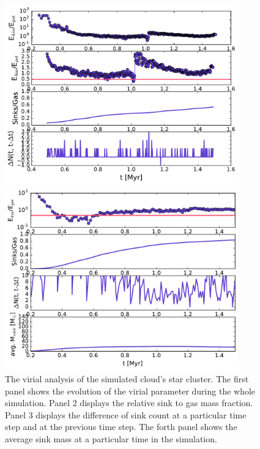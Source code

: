 \begin{figure}[!htb]
 \centering
 \includegraphics[width=0.9\textwidth]{Figures/cloud_plots/virial_IRcloud}
 \captionsetup{justification=justified,singlelinecheck=false,width=\linewidth}
 \decoRule
 \caption[The star cluster's virial analysis]{The virial analysis of the simulated cloud's star cluster.
                                              The first panel shows the evolution of the virial parameter during the whole simulation.
                                              Panel 2 displays the relative sink to gas mass fraction.
                                              Panel 3 displays the difference of sink count at a particular time step and at the previous time step.
                                              The forth panel shows the average sink mass at a particular time in the simulation.}
 \label{fig:Cluster_virial}
 \includegraphics[width=0.9\textwidth]{Figures/cloud_plots/virial_noRTcloud}

\end{figure}
